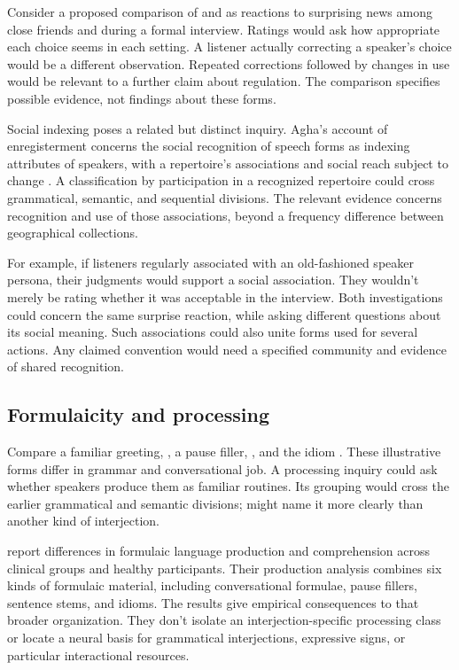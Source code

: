 \documentclass[12pt]{article}
\begin{document}
Consider a proposed comparison of  and 
as reactions to surprising news among close friends and during a
formal interview. Ratings would ask how appropriate each choice seems
in each setting. A listener actually correcting a speaker's choice
would be a different observation. Repeated corrections followed by
changes in use would be relevant to a further claim about regulation.
The comparison specifies possible evidence, not findings about these forms.

Social indexing poses a related but distinct inquiry. Agha's account
of enregisterment concerns the social recognition of speech forms as
indexing attributes of speakers, with a repertoire's associations and
social reach subject to change \citep[38--40]{agha2005}. A classification
by participation in a recognized repertoire could cross grammatical,
semantic, and sequential divisions. The relevant evidence concerns
recognition and use of those associations, beyond a frequency difference
between geographical collections.

For example, if listeners regularly associated  with an
old-fashioned speaker persona, their judgments would support a social
association. They wouldn't merely be rating whether it was acceptable
in the interview. Both investigations could concern the same surprise
reaction, while asking different questions about its social meaning.
Such associations could also unite forms used for several actions.
Any claimed convention would need a specified community and evidence
of shared recognition.

\subsection{Formulaicity and processing}

Compare a familiar greeting, , a pause filler,
, and the idiom . These illustrative
forms differ in grammar and conversational job. A processing inquiry
could ask whether speakers produce them as familiar routines.
Its grouping would cross the earlier grammatical and semantic divisions;
 might name it more clearly than another
kind of interjection.

\textcite{vanlanckersidtis2015} report differences in formulaic
language production and comprehension across clinical groups and
healthy participants. Their production
analysis combines six kinds of formulaic material, including conversational
formulae, pause fillers, sentence stems, and idioms. The results give
empirical consequences to that broader organization. They don't
isolate an interjection-specific processing class or locate a neural
basis for grammatical interjections, expressive signs, or particular interactional resources.
\end{document}
